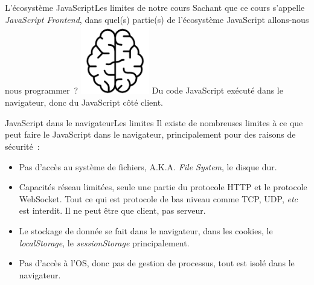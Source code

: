 \documentclass{beamer}
\begin{document}
    \begin{frame}{L'écosystème JavaScript}{Les limites de notre cours}
        Sachant que ce cours s'appelle \textit{JavaScript Frontend}, dans quel(s) partie(s) de l'écosystème JavaScript allons-nous nous programmer~?
        \bigbreak
        \centering
        \includegraphics[width=3cm]{image/intelligence}
        \pause
        \bigbreak
        Du code JavaScript exécuté dans le navigateur, donc du JavaScript côté client.
    \end{frame}

    \begin{frame}{JavaScript dans le navigateur}{Les limites}
        Il existe de nombreuses limites à ce que peut faire le JavaScript dans le navigateur, principalement pour des raisons de sécurité~:
        \begin{itemize}
            \item Pas d'accès au système de fichiers, A.K.A. \textit{File System}, le disque dur.
            \item Capacités réseau limitées, seule une partie du protocole HTTP et le protocole WebSocket.
            Tout ce qui est protocole de bas niveau comme TCP, UDP, \textit{etc} est interdit.
            Il ne peut être que client, pas serveur.
            \item Le stockage de donnée se fait dans le navigateur, dans les cookies, le \textit{localStorage}, le \textit{sessionStorage} principalement.
            \item Pas d'accès à l'OS, donc pas de gestion de processus, tout est isolé dans le navigateur.
        \end{itemize}
    \end{frame}
\end{document}
